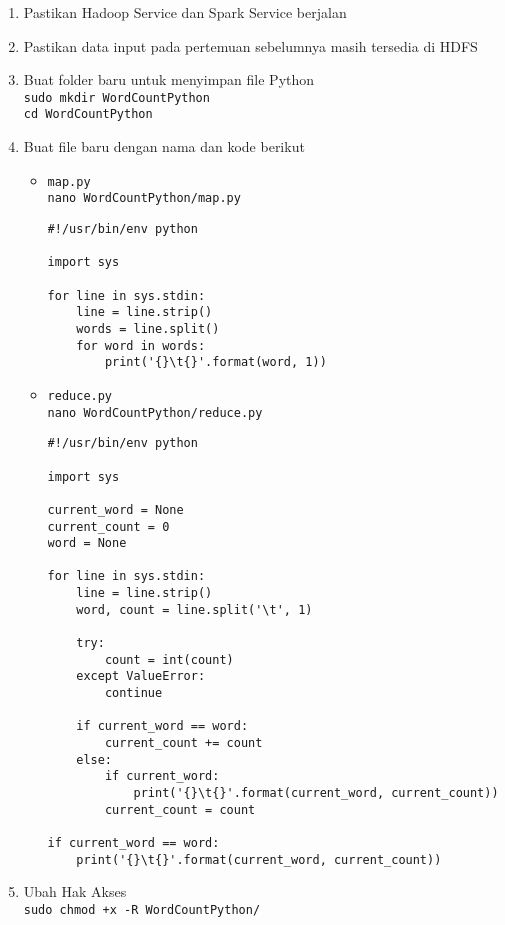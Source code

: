 \documentclass[a4paper]{tufte-handout}
\begin{document}
\begin{enumerate}
\item Pastikan Hadoop Service dan Spark Service berjalan
\item Pastikan data input pada pertemuan sebelumnya masih tersedia di HDFS
\item Buat folder baru untuk menyimpan file Python \\
{\tt sudo mkdir WordCountPython} \\
{\tt cd WordCountPython}

\item Buat file baru dengan nama dan kode berikut
\begin{itemize}
\item {\tt map.py} \\
{\tt nano WordCountPython/map.py}
\begin{lstlisting}
#!/usr/bin/env python

import sys

for line in sys.stdin:
    line = line.strip()
    words = line.split()
    for word in words:
        print('{}\t{}'.format(word, 1))
\end{lstlisting}

\item {\tt reduce.py} \\
{\tt nano WordCountPython/reduce.py}
\begin{lstlisting}
#!/usr/bin/env python

import sys

current_word = None
current_count = 0
word = None

for line in sys.stdin:
    line = line.strip()
    word, count = line.split('\t', 1)

    try:
        count = int(count)
    except ValueError:
        continue

    if current_word == word:
        current_count += count
    else:
        if current_word:
            print('{}\t{}'.format(current_word, current_count))
        current_count = count

if current_word == word:
    print('{}\t{}'.format(current_word, current_count))
\end{lstlisting}
\end{itemize}

\item Ubah Hak Akses \\
{\tt sudo chmod +x -R WordCountPython/} 


\end{enumerate}
\end{document}
